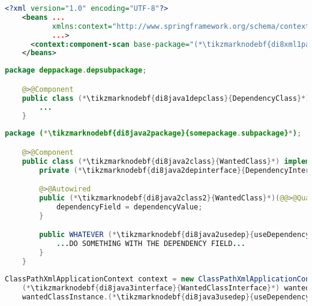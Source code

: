 \enlargethispage{20mm}
\thispagestyle{empty}
\begin{lstlisting}[language=XML, title={Configuration XML}]
    <?xml version="1.0" encoding="UTF-8"?>
    <beans ...
           xmlns:context="http://www.springframework.org/schema/context"
           ...>
      <context:component-scan base-package="(*\tikzmarknodebf{di8xml1package}{somepackage.subpackage}[ForestGreen]*)"/>
    </beans>
\end{lstlisting}
\begin{lstlisting}[language=Java, title={Dependency class}]
    package deppackage.depsubpackage;

    @>@Component
    public class (*\tikzmarknodebf{di8java1depclass}{DependencyClass}*) implements (*\tikzmarknodebf{di8java1depinterface}{DependencyInterface}*) {
        ...
    }
\end{lstlisting}
\begin{lstlisting}[language=Java, title={Wanted class with the constructor}]
    package (*\tikzmarknodebf{di8java2package}{somepackage.subpackage}*);

    @>@Component
    public class (*\tikzmarknodebf{di8java2class}{WantedClass}*) implements (*\tikzmarknodebf{di8java2interface}{WantedClassInterface}*) {
        private (*\tikzmarknodebf{di8java2depinterface}{DependencyInterface}*) dependencyField;

        @>@Autowired
        public (*\tikzmarknodebf{di8java2class2}{WantedClass}*)(@@>@Qualifier<@@("(*\tikzmarknodebf{di8java2depbeanid}{dependencyClass}[ForestGreen]*)") (*\tikzmarknodebf{di8java2depinterface2}{DependencyInterface}*) dependencyValue) {
            dependencyField = dependencyValue;
        }

        public WHATEVER (*\tikzmarknodebf{di8java2usedep}{useDependency}*)() {
            ...DO SOMETHING WITH THE DEPENDENCY FIELD...
        }
    }
\end{lstlisting}
\begin{lstlisting}[language=Java, title={Usage}]
    ClassPathXmlApplicationContext context = new ClassPathXmlApplicationContext("configurationFile.xml");
    (*\tikzmarknodebf{di8java3interface}{WantedClassInterface}*) wantedClassInstance = context.getBean("(*\tikzmarknodebf{di8java3beanid}{wantedClass}[ForestGreen]*)", (*\tikzmarknodebf{di8java3interface2}{WantedClassInterface}*).class);
    wantedClassInstance.(*\tikzmarknodebf{di8java3usedep}{useDependency}*)();
\end{lstlisting}
